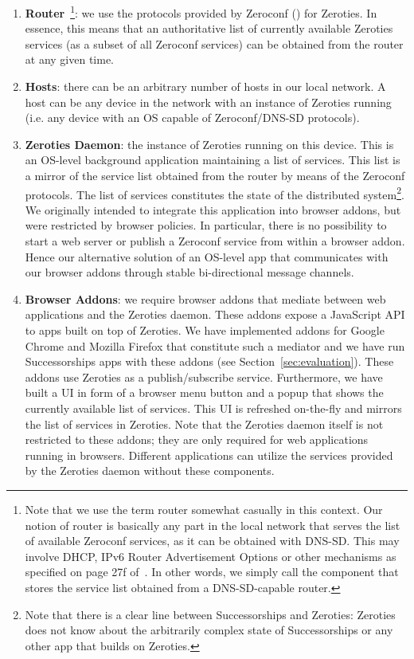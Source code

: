 \begin{enumerate}
\item \textbf{Router}~\footnote{Note that we use the term router somewhat casually in this context. Our notion of router is basically any part in the local network that serves the list of available Zeroconf services, as it can be obtained with DNS-SD. This may involve DHCP, IPv6 Router Advertisement Options or other mechanisms as specified on page 27f of~\cite{cheshire_2013_dnssd}. In other words, we simply call the component that stores the service list obtained from a DNS-SD-capable router.}: we use the protocols provided by Zeroconf (\cite{cheshire_2013_dnssd, cheshire_2013_mdns}) for Zeroties. 
In essence, this means that an authoritative list of currently available Zeroties services (as a subset of all Zeroconf services) can be obtained from the router at any given time.

\item \textbf{Hosts}: there can be an arbitrary number of hosts in our local network. A host can be any device in the network with an instance of Zeroties running (i.e. any device with an OS capable of Zeroconf/DNS-SD protocols).

\item \textbf{Zeroties Daemon}: the instance of Zeroties running on this device. 
This is an OS-level background application maintaining a list of services.
This list is a mirror of the service list obtained from the router by means of the Zeroconf protocols. 
The list of services constitutes the state of the distributed system\footnote{Note that there is a clear line between Successorships and Zeroties: Zeroties does not know about the arbitrarily complex state of Successorships or any other app that builds on Zeroties.}.
We originally intended to integrate this application into browser addons, but were restricted by browser policies.
In particular, there is no possibility to start a web server or publish a Zeroconf service from within a browser addon.
Hence our alternative solution of an OS-level app that communicates with our browser addons through stable bi-directional message channels.

\item \textbf{Browser Addons}: we require browser addons that mediate between web applications and the Zeroties daemon. These addons expose a JavaScript API to apps built on top of Zeroties.
We have implemented addons for Google Chrome and Mozilla Firefox that constitute such a mediator and we have run Successorships apps with these addons (see Section~\ref{sec:evaluation}).
These addons use Zeroties as a publish/subscribe service.
Furthermore, we have built a UI in form of a browser menu button and a popup that shows the currently available list of services.
This UI is refreshed on-the-fly and mirrors the list of services in Zeroties.
Note that the Zeroties daemon itself is not restricted to these addons; they are only required for web applications running in browsers.
Different applications can utilize the services provided by the Zeroties daemon without these components.


\end{enumerate}
